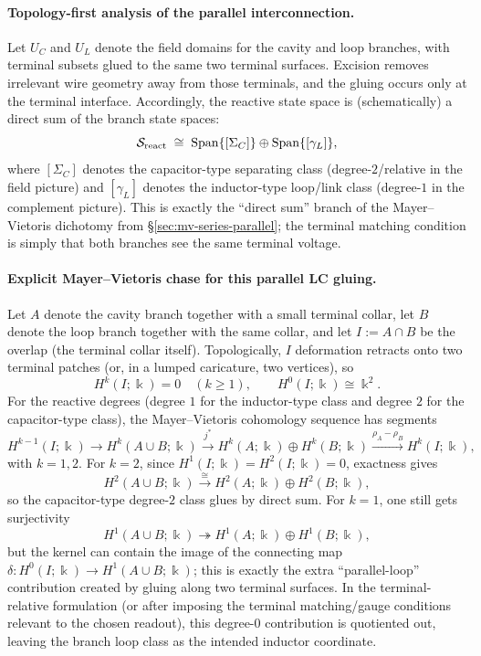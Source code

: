 \documentclass[11pt]{article}
\begin{document}
\paragraph{Topology-first analysis of the parallel interconnection.}
Let $U_C$ and $U_L$ denote the field domains for the cavity and loop branches, with terminal subsets glued to the same two terminal surfaces.
Excision removes irrelevant wire geometry away from those terminals, and the gluing occurs only at the terminal interface.
Accordingly, the reactive state space is (schematically) a direct sum of the branch state spaces:
\[
\mathcal{S}_{\mathrm{react}}
\;\cong\;
\operatorname{Span}\{[\Sigma_C]\}\oplus \operatorname{Span}\{[\gamma_L]\},
\]
where $[\Sigma_C]$ denotes the capacitor-type separating class (degree-$2$/relative in the field picture) and $[\gamma_L]$ denotes the inductor-type loop/link class (degree-$1$ in the complement picture).
This is exactly the ``direct sum'' branch of the Mayer--Vietoris dichotomy from \S\ref{sec:mv-series-parallel}; the terminal matching condition is simply that both branches see the same terminal voltage.

\paragraph{Explicit Mayer--Vietoris chase for this parallel LC gluing.}
Let $A$ denote the cavity branch together with a small terminal collar, let $B$ denote the loop branch together with the same collar, and let $I:=A\cap B$ be the overlap (the terminal collar itself).
Topologically, $I$ deformation retracts onto two terminal patches (or, in a lumped caricature, two vertices), so
\[
H^k(I;\Bbbk)=0\quad (k\ge 1),\qquad H^0(I;\Bbbk)\cong \Bbbk^2.
\]
For the reactive degrees (degree $1$ for the inductor-type class and degree $2$ for the capacitor-type class), the Mayer--Vietoris cohomology sequence has segments
\[
H^{k-1}(I;\Bbbk)\longrightarrow H^k(A\cup B;\Bbbk)\xrightarrow{j^\ast}
H^k(A;\Bbbk)\oplus H^k(B;\Bbbk)\xrightarrow{\rho_A-\rho_B} H^k(I;\Bbbk),
\]
with $k=1,2$.
For $k=2$, since $H^1(I;\Bbbk)=H^2(I;\Bbbk)=0$, exactness gives
\[
H^2(A\cup B;\Bbbk)\xrightarrow{\;\cong\;} H^2(A;\Bbbk)\oplus H^2(B;\Bbbk),
\]
so the capacitor-type degree-$2$ class glues by direct sum.
For $k=1$, one still gets surjectivity
\[
H^1(A\cup B;\Bbbk)\twoheadrightarrow H^1(A;\Bbbk)\oplus H^1(B;\Bbbk),
\]
but the kernel can contain the image of the connecting map $\delta\colon H^0(I;\Bbbk)\to H^1(A\cup B;\Bbbk)$; this is exactly the extra ``parallel-loop'' contribution created by gluing along two terminal surfaces.
In the terminal-relative formulation (or after imposing the terminal matching/gauge conditions relevant to the chosen readout), this degree-$0$ contribution is quotiented out, leaving the branch loop class as the intended inductor coordinate.
\end{document}
